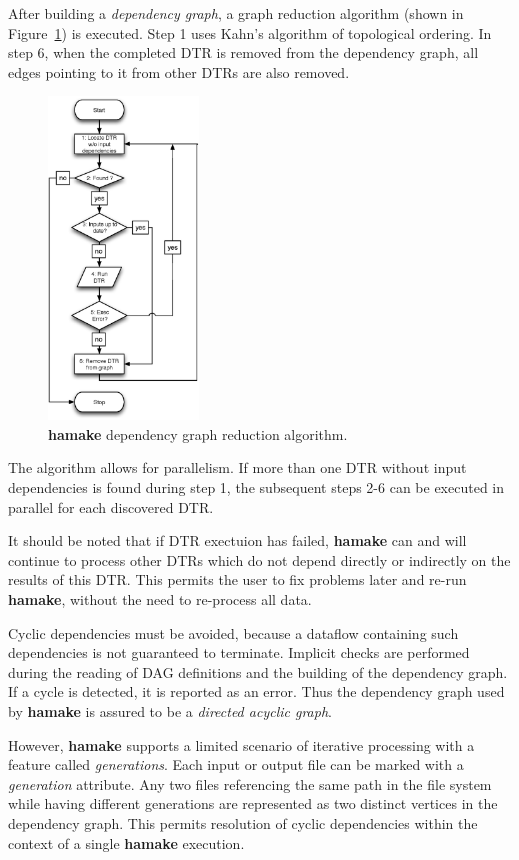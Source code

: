 \documentclass[a4paper,twoside]{article}
\begin{document}
After building a \textit{dependency graph}, a graph reduction algorithm (shown in Figure~\ref{fig:grred}) is executed. Step 1 uses Kahn's algorithm\cite{kahn1962topological} of topological ordering. In step 6, when the completed DTR is removed from the dependency graph, all edges pointing to it from other DTRs are also removed.

\begin{figure}[htp]
\centering
\includegraphics[width=4cm]{GraphReduction.eps}
\caption{\textbf{hamake} dependency graph reduction algorithm.}
\label{fig:grred}
\end{figure}

The algorithm allows for parallelism. If more than one DTR without
input dependencies is found during step 1, the subsequent steps 2-6 can be executed in parallel for each discovered DTR.

It should be noted that if DTR exectuion has failed, \textbf{hamake} can and will continue to process other DTRs which do not depend directly or indirectly on the results of this DTR. This permits the user to fix problems later and re-run \textbf{hamake}, without the need to re-process all data.

Cyclic dependencies must be avoided, because a dataflow containing
such dependencies is not guaranteed to terminate. Implicit checks are performed during the reading of DAG definitions and the building of the dependency graph. If a cycle is detected, it is reported as an error. Thus the dependency graph used by \textbf{hamake} is assured to be a \textit{directed acyclic graph}.

However, \textbf{hamake} supports a limited scenario of iterative
processing with a feature called \textit{generations}. Each input or
output file can be marked with a \emph{generation}
attribute. Any two files referencing the same path in the file system while having different generations are represented as two distinct vertices in the dependency graph. This permits resolution of cyclic dependencies within the context of a single \textbf{hamake} execution.
\end{document}
